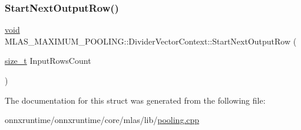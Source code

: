 \mbox{\label{structMLAS__MAXIMUM__POOLING_1_1DividerVectorContext_ac9816bc12207611e2558121602027305}} 
\subsubsection{\texorpdfstring{Start\+Next\+Output\+Row()}{StartNextOutputRow()}}
{\footnotesize\ttfamily \mbox{\hyperlink{mlasi_8h_a88f941d423cb2a819b70a1358982b1a6}{void}} M\+L\+A\+S\+\_\+\+M\+A\+X\+I\+M\+U\+M\+\_\+\+P\+O\+O\+L\+I\+N\+G\+::\+Divider\+Vector\+Context\+::\+Start\+Next\+Output\+Row (\begin{DoxyParamCaption}\item[{\mbox{\hyperlink{mlasi_8h_a503efbc1c6e50825320ad909366b78ab}{size\+\_\+t}}}]{Input\+Rows\+Count }\end{DoxyParamCaption})\hspace{0.3cm}{\ttfamily [inline]}}



The documentation for this struct was generated from the following file\+:\begin{DoxyCompactItemize}
\item 
onnxruntime/onnxruntime/core/mlas/lib/\mbox{\hyperlink{pooling_8cpp}{pooling.\+cpp}}\end{DoxyCompactItemize}
